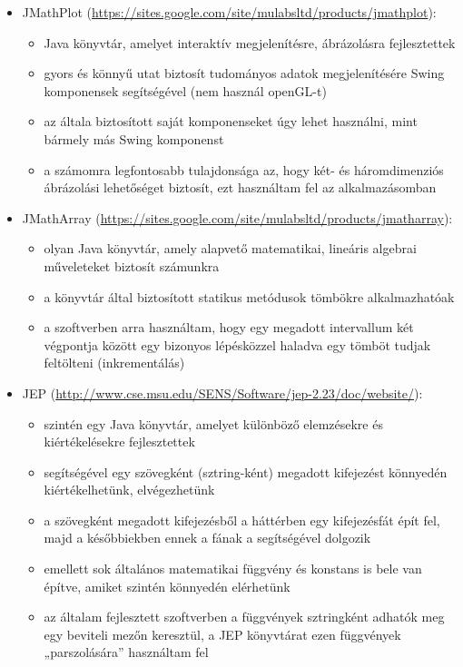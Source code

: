	\begin{itemize}
		\item JMathPlot (\url{https://sites.google.com/site/mulabsltd/products/jmathplot}):
		\begin{itemize}
			\item Java könyvtár, amelyet interaktív megjelenítésre, ábrázolásra fejlesztettek
			\item gyors és könnyű utat biztosít tudományos adatok megjelenítésére Swing komponensek segítségével (nem használ openGL-t)
			\item az általa biztosított saját komponenseket úgy lehet használni, mint bármely más Swing komponenst
			\item a számomra legfontosabb tulajdonsága az, hogy két- és háromdimenziós ábrázolási lehetőséget biztosít, ezt használtam fel az alkalmazásomban
		\end{itemize}
		\item JMathArray (\url{https://sites.google.com/site/mulabsltd/products/jmatharray}):
		\begin{itemize}
			\item olyan Java könyvtár, amely alapvető matematikai, lineáris algebrai műveleteket biztosít számunkra 
			\item a könyvtár által biztosított statikus metódusok tömbökre alkalmazhatóak
			\item a szoftverben arra használtam, hogy egy megadott intervallum két végpontja között egy bizonyos lépésközzel haladva egy tömböt tudjak feltölteni (inkrementálás)
		\end{itemize}
		\item JEP (\url{http://www.cse.msu.edu/SENS/Software/jep-2.23/doc/website/}):
		\begin{itemize}
			\item szintén egy Java könyvtár, amelyet különböző elemzésekre és kiértékelésekre fejlesztettek
			\item segítségével egy szövegként (sztring-ként) megadott kifejezést könnyedén kiértékelhetünk, elvégezhetünk
			\item a szövegként megadott kifejezésből a háttérben egy kifejezésfát épít fel, majd a későbbiekben ennek a fának a segítségével dolgozik
			\item emellett sok általános matematikai függvény és konstans is bele van építve, amiket szintén könnyedén elérhetünk
			\item az általam fejlesztett szoftverben a függvények sztringként adhatók meg egy beviteli mezőn keresztül, a JEP könyvtárat ezen függvények „parszolására” használtam fel
		\end{itemize}
	\end{itemize}


